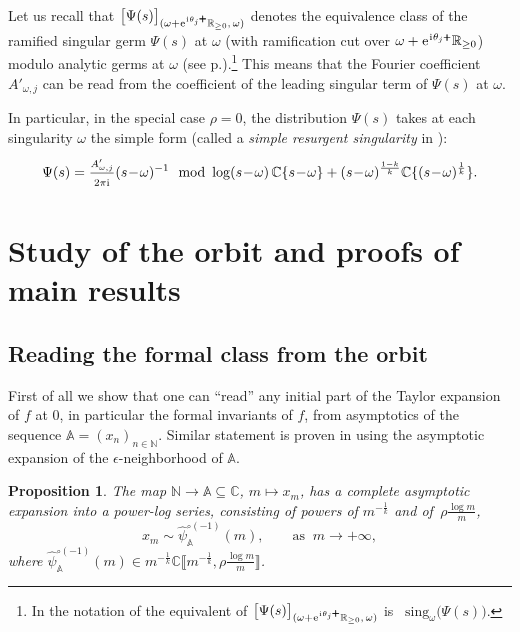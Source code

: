 \documentclass[a4paper,11pt]{amsart}
\numberwithin{equation}{section}
\newcommand{\C}{{\mathbb C}}
\newcommand{\N}{{\mathbb N}}
\newcommand{\R}{{\mathbb R}}
\newcommand{\mfrac}[2]{\tfrac{#1\strut}{#2\strut}}
\renewcommand{\i}{\mathrm{i}\mkern.25\thinmuskip}
\newcommand{\e}{\ensuremath{\mkern.25\thinmuskip\mathrm{e}\mkern.4\thinmuskip}}
\newcommand{\orbit}{\mathbb{A}}
\newcommand{\pls}{{\scalebox{0.7}{$\pmb{+}$}}}
\newtheorem{proposition}[theorem]{Proposition}
\theoremstyle{definition}
\begin{document}
Let us recall that $\big[\Psi(s)\big]_{(\omega+\e^{\i\theta_j\pls}\R_{\geq 0},\, \omega)}$ denotes the equivalence class of the ramified singular germ $\Psi(s)$ at $\omega$ (with ramification cut over $\omega+\e^{\i\theta_j\pls}\R_{\geq 0}$) modulo analytic germs at $\omega$ (see p.\pageref{p:germofhyperfunction}).\footnote{In the notation of \cite[p.200]{MitschiSauzin} the equivalent of $\big[\Psi(s)\big]_{(\omega+\e^{\i\theta_j\pls}\R_{\geq 0},\, \omega)}$ is \ $\textrm{sing}_\omega\big(\Psi(s)\big)$.}
This means that the Fourier coefficient $A'_{\omega,j}$ can be read from the coefficient of the leading singular term of $\Psi(s)$ at $\omega$.  


In particular, in the special case $\rho=0$, the distribution $\Psi(s)$ takes at each singularity $\omega$ the simple form (called a \emph{simple resurgent singularity} in \cite{MitschiSauzin}):
\begin{equation*}\label{eq:srs}
\Psi(s)=\mfrac{{A}'_{\omega,j}}{2\pi\i }(s\!-\!\omega)^{-1} \mod \log(s\!-\!\omega)\,\C\{s\!-\!\omega\}+(s\!-\!\omega)^{\frac{1-k}{k}}\C\{(s\!-\!\omega)^{\frac{1}{k}} \}.
\end{equation*}







\section{Study of the orbit and proofs of main results}\label{sec:Thetaorbit}


\subsection{Reading the formal class from the orbit}
First of all we show that one can ``read'' any initial part of the Taylor expansion of $f$ at $0$, in particular the formal invariants of $f$, from asymptotics of the sequence $\orbit=(x_n)_{n\in\N}$. Similar statement is proven in \cite{Resman1} using the asymptotic expansion of the $\epsilon$-neighborhood of $\orbit$.


\begin{proposition}
	The map $\N\to\orbit\subseteq \mathbb C$, $m\mapsto x_m$, has a complete   asymptotic expansion into a power-log series, consisting of powers of $m^{-\frac1k}$ and of $\,\rho\frac{\log m}{m}$,
	\[x_m \sim\hat\psi_\orbit^{\circ(-1)}(m),\qquad\text{as }\ m\to+\infty,\]
	where $\hat\psi_\orbit^{\circ(-1)}(m)\in m^{-\frac1k}\C\llbracket m^{-\frac1k},\rho\frac{\log m}{m}\rrbracket$.
\end{proposition}
\end{document}
